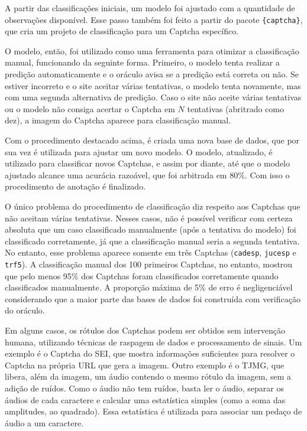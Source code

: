 \documentclass[12pt,twoside,brazilian]{book}
\begin{document}
A partir das classificações iniciais, um modelo foi ajustado com a
quantidade de observações disponível. Esse passo também foi feito a
partir do pacote \texttt{\{captcha\}}, que cria um projeto de
classificação para um Captcha específico.

O modelo, então, foi utilizado como uma ferramenta para otimizar a
classificação manual, funcionando da seguinte forma. Primeiro, o modelo
tenta realizar a predição automaticamente e o oráculo avisa se a
predição está correta ou não. Se estiver incorreto e o site aceitar
várias tentativas, o modelo tenta novamente, mas com uma segunda
alternativa de predição. Caso o site não aceite várias tentativas ou o
modelo não consiga acertar o Captcha em \(N\) tentativas (abritrado como
dez), a imagem do Captcha aparece para classificação manual.

Com o procedimento destacado acima, é criada uma nova base de dados, que
por sua vez é utilizada para ajustar um novo modelo. O modelo,
atualizado, é utilizado para classificar novos Captchas, e assim por
diante, até que o modelo ajustado alcance uma acurácia razoável, que foi
arbitrada em 80\%. Com isso o procedimento de anotação é finalizado.

O único problema do procedimento de classificação diz respeito aos
Captchas que não aceitam várias tentativas. Nesses casos, não é possível
verificar com certeza absoluta que um caso classificado manualmente
(após a tentativa do modelo) foi classificado corretamente, já que a
classificação manual seria a segunda tentativa. No entanto, esse
problema aparece somente em três Captchas (\texttt{cadesp},
\texttt{jucesp} e \texttt{trf5}). A classificação manual dos 100
primeiros Captchas, no entanto, mostrou que pelo menos 95\% dos Captchas
foram classificados corretamente quando classificados manualmente. A
proporção máxima de 5\% de erro é negligenciável considerando que a
maior parte das bases de dados foi construída com verificação do
oráculo.

Em alguns casos, os rótulos dos Captchas podem ser obtidos sem
intervenção humana, utilizando técnicas de raspagem de dados e
processamento de sinais. Um exemplo é o Captcha do SEI, que mostra
informações suficientes para resolver o Captcha na própria URL que gera
a imagem. Outro exemplo é o TJMG, que libera, além da imagem, um áudio
contendo o mesmo rótulo da imagem, sem a adição de ruídos. Como o áudio
não tem ruídos, basta ler o áudio, separar os áudios de cada caractere e
calcular uma estatística simples (como a soma das amplitudes, ao
quadrado). Essa estatística é utilizada para associar um pedaço de áudio
a um caractere.
\end{document}
